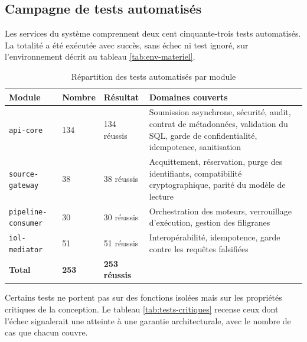 
\subsection{Campagne de tests automatisés}

Les services du système comprennent deux cent cinquante-trois tests automatisés.
La totalité a été exécutée avec succès, sans échec ni test ignoré, sur
l'environnement décrit au tableau \ref{tab:env-materiel}.

\begin{table}[htbp]
\centering
\caption{Répartition des tests automatisés par module}
\label{tab:tests-modules}
\small
\begin{tabularx}{\textwidth}{|p{3.2cm}|p{1.4cm}|p{2cm}|X|}
\hline
\textbf{Module} & \textbf{Nombre} & \textbf{Résultat} & \textbf{Domaines couverts} \\ \hline

\texttt{api-core} & 134 & 134 réussis & Soumission asynchrone, sécurité, audit, contrat de
métadonnées, validation du SQL, garde de confidentialité, idempotence, sanitisation \\ \hline
\texttt{source-\allowbreak gateway} & 38 & 38 réussis & Acquittement, réservation, purge des identifiants,
compatibilité cryptographique, parité du modèle de lecture \\ \hline
\texttt{pipeline-\allowbreak consumer} & 30 & 30 réussis & Orchestration des moteurs, verrouillage
d'exécution, gestion des filigranes \\ \hline
\texttt{iol-mediator} & 51 & 51 réussis & Interopérabilité, idempotence, garde contre les
requêtes falsifiées \\ \hline
\textbf{Total} & \textbf{253} & \textbf{253 réussis} & \\ \hline

\end{tabularx}
\end{table}

Certains tests ne portent pas sur des fonctions isolées mais sur les propriétés
critiques de la conception. Le tableau \ref{tab:tests-critiques} recense ceux dont
l'échec signalerait une atteinte à une garantie architecturale, avec le nombre de
cas que chacun couvre.


